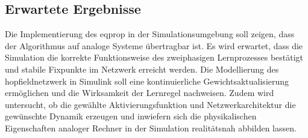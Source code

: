 \subsection{Erwartete Ergebnisse}

Die Implementierung des \gls{eqprop} in der Simulationsumgebung soll zeigen, dass der Algorithmus auf analoge Systeme übertragbar ist. Es wird erwartet, dass die Simulation die korrekte Funktionsweise des zweiphasigen Lernprozesses bestätigt und stabile Fixpunkte im Netzwerk erreicht werden. Die Modellierung des \gls{hopfieldnetzwerk} in Simulink soll eine kontinuierliche Gewichtsaktualisierung ermöglichen und die Wirksamkeit der Lernregel nachweisen. Zudem wird untersucht, ob die gewählte Aktivierungsfunktion und Netzwerkarchitektur die gewünschte Dynamik erzeugen und inwiefern sich die physikalischen Eigenschaften analoger Rechner in der Simulation realitätsnah abbilden lassen.

